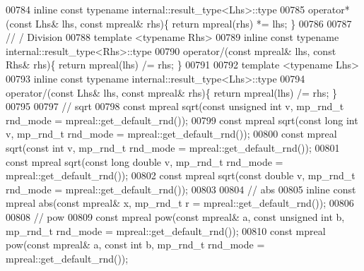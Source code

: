\begin{DoxyCode}
00784 \textcolor{keyword}{inline} \textcolor{keyword}{const} \textcolor{keyword}{typename} internal::result\_type<Lhs>::type
00785     operator*(\textcolor{keyword}{const} Lhs& lhs, \textcolor{keyword}{const} mpreal& rhs)\{ \textcolor{keywordflow}{return} mpreal(rhs) *= lhs;    \}
00786 
00787 \textcolor{comment}{// / Division}
00788 \textcolor{keyword}{template} <\textcolor{keyword}{typename} Rhs>
00789 \textcolor{keyword}{inline} \textcolor{keyword}{const} \textcolor{keyword}{typename} internal::result\_type<Rhs>::type
00790     operator/(\textcolor{keyword}{const} mpreal& lhs, \textcolor{keyword}{const} Rhs& rhs)\{ \textcolor{keywordflow}{return} mpreal(lhs) /= rhs;    \}
00791 
00792 \textcolor{keyword}{template} <\textcolor{keyword}{typename} Lhs>
00793 \textcolor{keyword}{inline} \textcolor{keyword}{const} \textcolor{keyword}{typename} internal::result\_type<Lhs>::type
00794     operator/(\textcolor{keyword}{const} Lhs& lhs, \textcolor{keyword}{const} mpreal& rhs)\{ \textcolor{keywordflow}{return} mpreal(lhs) /= rhs;    \}
00795 
00797 \textcolor{comment}{// sqrt}
00798 \textcolor{keyword}{const} mpreal sqrt(\textcolor{keyword}{const} \textcolor{keywordtype}{unsigned} \textcolor{keywordtype}{int} v, mp\_rnd\_t rnd\_mode = mpreal::get\_default\_rnd());
00799 \textcolor{keyword}{const} mpreal sqrt(\textcolor{keyword}{const} \textcolor{keywordtype}{long} \textcolor{keywordtype}{int} v, mp\_rnd\_t rnd\_mode = mpreal::get\_default\_rnd());
00800 \textcolor{keyword}{const} mpreal sqrt(\textcolor{keyword}{const} \textcolor{keywordtype}{int} v, mp\_rnd\_t rnd\_mode = mpreal::get\_default\_rnd());
00801 \textcolor{keyword}{const} mpreal sqrt(\textcolor{keyword}{const} \textcolor{keywordtype}{long} \textcolor{keywordtype}{double} v, mp\_rnd\_t rnd\_mode = mpreal::get\_default\_rnd());
00802 \textcolor{keyword}{const} mpreal sqrt(\textcolor{keyword}{const} \textcolor{keywordtype}{double} v, mp\_rnd\_t rnd\_mode = mpreal::get\_default\_rnd());
00803 
00804 \textcolor{comment}{// abs}
00805 \textcolor{keyword}{inline} \textcolor{keyword}{const} mpreal abs(\textcolor{keyword}{const} mpreal& x, mp\_rnd\_t r = mpreal::get\_default\_rnd());
00806 
00808 \textcolor{comment}{// pow}
00809 \textcolor{keyword}{const} mpreal pow(\textcolor{keyword}{const} mpreal& a, \textcolor{keyword}{const} \textcolor{keywordtype}{unsigned} \textcolor{keywordtype}{int} b, mp\_rnd\_t rnd\_mode = mpreal::get\_default\_rnd());
00810 \textcolor{keyword}{const} mpreal pow(\textcolor{keyword}{const} mpreal& a, \textcolor{keyword}{const} \textcolor{keywordtype}{int} b, mp\_rnd\_t rnd\_mode = mpreal::get\_default\_rnd());

\end{DoxyCode}
